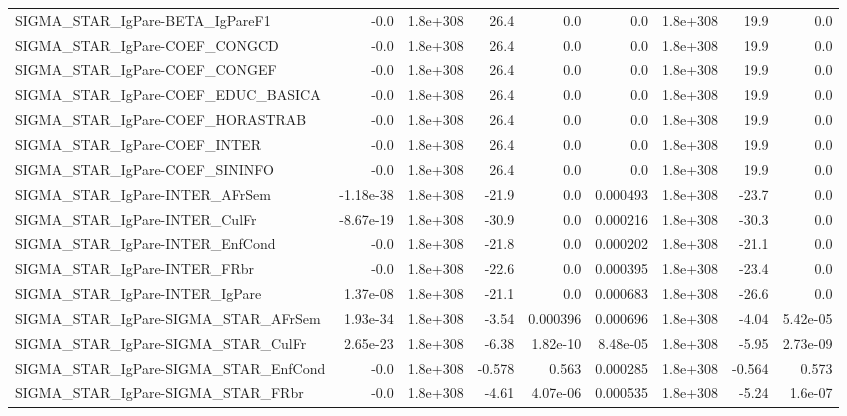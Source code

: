 \begin{tabular}{lrrrrrrrr}
SIGMA\_STAR\_IgPare-BETA\_IgPareF1      &        -0.0 &     1.8e+308 &    26.4 &      0.0 &        0.0 &    1.8e+308 &         19.9 &           0.0 \\
SIGMA\_STAR\_IgPare-COEF\_CONGCD        &        -0.0 &     1.8e+308 &    26.4 &      0.0 &        0.0 &    1.8e+308 &         19.9 &           0.0 \\
SIGMA\_STAR\_IgPare-COEF\_CONGEF        &        -0.0 &     1.8e+308 &    26.4 &      0.0 &        0.0 &    1.8e+308 &         19.9 &           0.0 \\
SIGMA\_STAR\_IgPare-COEF\_EDUC\_BASICA   &        -0.0 &     1.8e+308 &    26.4 &      0.0 &        0.0 &    1.8e+308 &         19.9 &           0.0 \\
SIGMA\_STAR\_IgPare-COEF\_HORASTRAB     &        -0.0 &     1.8e+308 &    26.4 &      0.0 &        0.0 &    1.8e+308 &         19.9 &           0.0 \\
SIGMA\_STAR\_IgPare-COEF\_INTER         &        -0.0 &     1.8e+308 &    26.4 &      0.0 &        0.0 &    1.8e+308 &         19.9 &           0.0 \\
SIGMA\_STAR\_IgPare-COEF\_SININFO       &        -0.0 &     1.8e+308 &    26.4 &      0.0 &        0.0 &    1.8e+308 &         19.9 &           0.0 \\
SIGMA\_STAR\_IgPare-INTER\_AFrSem       &   -1.18e-38 &     1.8e+308 &   -21.9 &      0.0 &   0.000493 &    1.8e+308 &        -23.7 &           0.0 \\
SIGMA\_STAR\_IgPare-INTER\_CulFr        &   -8.67e-19 &     1.8e+308 &   -30.9 &      0.0 &   0.000216 &    1.8e+308 &        -30.3 &           0.0 \\
SIGMA\_STAR\_IgPare-INTER\_EnfCond      &        -0.0 &     1.8e+308 &   -21.8 &      0.0 &   0.000202 &    1.8e+308 &        -21.1 &           0.0 \\
SIGMA\_STAR\_IgPare-INTER\_FRbr         &        -0.0 &     1.8e+308 &   -22.6 &      0.0 &   0.000395 &    1.8e+308 &        -23.4 &           0.0 \\
SIGMA\_STAR\_IgPare-INTER\_IgPare       &    1.37e-08 &     1.8e+308 &   -21.1 &      0.0 &   0.000683 &    1.8e+308 &        -26.6 &           0.0 \\
SIGMA\_STAR\_IgPare-SIGMA\_STAR\_AFrSem  &    1.93e-34 &     1.8e+308 &   -3.54 & 0.000396 &   0.000696 &    1.8e+308 &        -4.04 &      5.42e-05 \\
SIGMA\_STAR\_IgPare-SIGMA\_STAR\_CulFr   &    2.65e-23 &     1.8e+308 &   -6.38 & 1.82e-10 &   8.48e-05 &    1.8e+308 &        -5.95 &      2.73e-09 \\
SIGMA\_STAR\_IgPare-SIGMA\_STAR\_EnfCond &        -0.0 &     1.8e+308 &  -0.578 &    0.563 &   0.000285 &    1.8e+308 &       -0.564 &         0.573 \\
SIGMA\_STAR\_IgPare-SIGMA\_STAR\_FRbr    &        -0.0 &     1.8e+308 &   -4.61 & 4.07e-06 &   0.000535 &    1.8e+308 &        -5.24 &       1.6e-07 \\
\bottomrule
\end{tabular}
